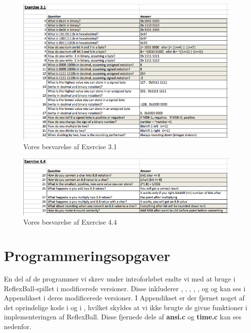 \begin{figure}[h!]
\centering
\includegraphics[scale=0.6]{figs/Ex3.png}
\caption{Vores besvarelse af Exercise 3.1}
\label{fig:Ex3.1}
\end{figure}

\begin{figure}[h!]
\centering
\includegraphics[scale=0.6]{figs/Ex4.png}
\caption{Vores besvarelse af Exercise 4.4}
\label{fig:Ex4.4}
\end{figure}

\newpage

\section{Programmeringsopgaver}
En del af de programmer vi skrev under introforløbet endte vi med at bruge i ReflexBall-spillet i modificerede versioner. Disse inkluderer , , , , ,  og  og kan ses i Appendikset \textbf{} i deres modificerede versioner. I Appendikset \textbf{} er der fjernet noget af det oprindelige kode i  og i , hvilket skyldes at vi ikke brugte de givne funktioner i implementeringen af ReflexBall. Disse fjernede dele af \textbf{ansi.c} og \textbf{time.c} kan ses nedenfor.
\newpage

